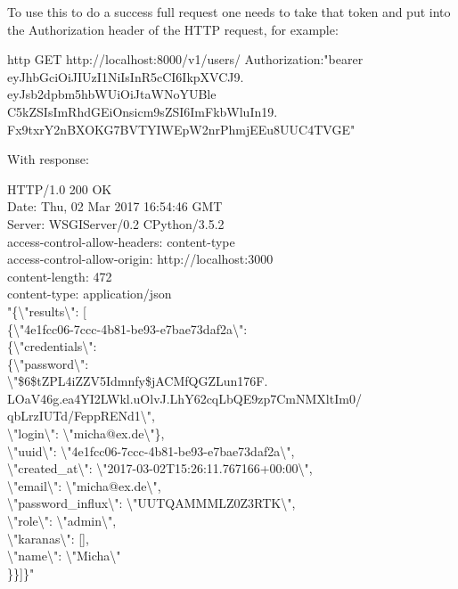 To use this to do a success full request one needs to take that token and put into the Authorization header of the HTTP request, for example:
\begin{tcolorbox}
http GET http://localhost:8000/v1/users/ Authorization:"bearer\\ eyJhbGciOiJIUzI1NiIsInR5cCI6IkpXVCJ9.\\
eyJsb2dpbm5hbWUiOiJtaWNoYUBle\\
C5kZSIsImRhdGEiOnsicm9sZSI6ImFkbWluIn19.\\
Fx9txrY2nBXOKG7BVTYIWEpW2nrPhmjEEu8UUC4TVGE"
\end{tcolorbox}
With response:
\begin{tcolorbox}
HTTP/1.0 200 OK\\
Date: Thu, 02 Mar 2017 16:54:46 GMT\\
Server: WSGIServer/0.2 CPython/3.5.2\\
access-control-allow-headers: content-type\\
access-control-allow-origin: http://localhost:3000\\
content-length: 472\\
content-type: application/json\\

"\{\textbackslash"results\textbackslash": [\\
\{\textbackslash"4e1fcc06-7ccc-4b81-be93-e7bae73daf2a\textbackslash": \\
\{\textbackslash"credentials\textbackslash":\\ 
\{\textbackslash"password\textbackslash":\\ \textbackslash"\$6\$tZPL4iZZV5Idmnfy\$jACMfQGZLun176F.\\
LOaV46g.ea4YI2LWkl.uOlvJ.LhY62cqLbQE9zp7CmNMXltIm0/\\qbLrzIUTd/FeppRENd1\textbackslash",\\
\textbackslash"login\textbackslash": \textbackslash"micha@ex.de\textbackslash"\},\\ 
\textbackslash"uuid\textbackslash": \textbackslash"4e1fcc06-7ccc-4b81-be93-e7bae73daf2a\textbackslash",\\
\textbackslash"created\_at\textbackslash": \textbackslash"2017-03-02T15:26:11.767166+00:00\textbackslash",\\
\textbackslash"email\textbackslash": \textbackslash"micha@ex.de\textbackslash",\\
\textbackslash"password\_influx\textbackslash": \textbackslash"UUTQAMMMLZ0Z3RTK\textbackslash",\\
\textbackslash"role\textbackslash": \textbackslash"admin\textbackslash",\\
\textbackslash"karanas\textbackslash": [],\\
\textbackslash"name\textbackslash": \textbackslash"Micha\textbackslash"\\
\}\}]\}"
\end{tcolorbox}
